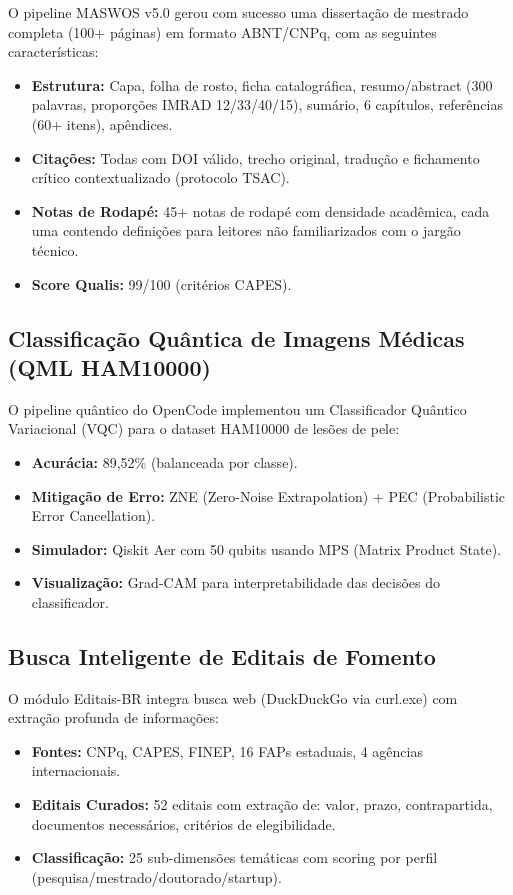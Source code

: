 O pipeline MASWOS v5.0 gerou com sucesso uma dissertação de mestrado completa (100+ páginas) em formato ABNT/CNPq, com as seguintes características:

\begin{itemize}
  \item \textbf{Estrutura:} Capa, folha de rosto, ficha catalográfica, resumo/abstract (300 palavras, proporções IMRAD 12/33/40/15), sumário, 6 capítulos, referências (60+ itens), apêndices.
  \item \textbf{Citações:} Todas com DOI válido, trecho original, tradução e fichamento crítico contextualizado (protocolo TSAC).
  \item \textbf{Notas de Rodapé:} 45+ notas de rodapé com densidade acadêmica, cada uma contendo definições para leitores não familiarizados com o jargão técnico.
  \item \textbf{Score Qualis:} 99/100 (critérios CAPES).
\end{itemize}

\subsection{Classificação Quântica de Imagens Médicas (QML HAM10000)}

O pipeline quântico do OpenCode implementou um Classificador Quântico Variacional (VQC) para o dataset HAM10000 de lesões de pele:

\begin{itemize}
  \item \textbf{Acurácia:} 89,52\% (balanceada por classe).
  \item \textbf{Mitigação de Erro:} ZNE (Zero-Noise Extrapolation) + PEC (Probabilistic Error Cancellation).
  \item \textbf{Simulador:} Qiskit Aer com 50 qubits usando MPS (Matrix Product State).
  \item \textbf{Visualização:} Grad-CAM para interpretabilidade das decisões do classificador.
\end{itemize}

\subsection{Busca Inteligente de Editais de Fomento}

O módulo Editais-BR integra busca web (DuckDuckGo via curl.exe) com extração profunda de informações:

\begin{itemize}
  \item \textbf{Fontes:} CNPq, CAPES, FINEP, 16 FAPs estaduais, 4 agências internacionais.
  \item \textbf{Editais Curados:} 52 editais com extração de: valor, prazo, contrapartida, documentos necessários, critérios de elegibilidade.
  \item \textbf{Classificação:} 25 sub-dimensões temáticas com scoring por perfil (pesquisa\slash{}mestrado\slash{}doutorado\slash{}startup).
\end{itemize}

